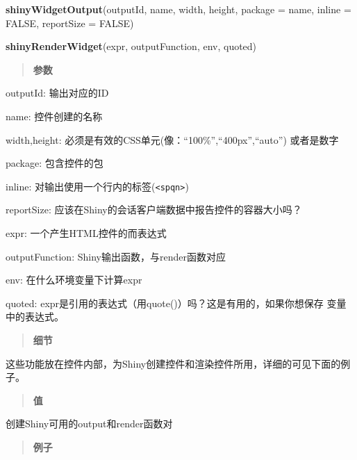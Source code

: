 \documentclass[]{book}
\newenvironment{Shaded}{\begin{snugshade}}{\end{snugshade}}
\newcommand{\KeywordTok}[1]{\textcolor[rgb]{0.13,0.29,0.53}{\textbf{#1}}}
\newcommand{\DataTypeTok}[1]{\textcolor[rgb]{0.13,0.29,0.53}{#1}}
\newcommand{\OtherTok}[1]{\textcolor[rgb]{0.56,0.35,0.01}{#1}}
\newcommand{\NormalTok}[1]{#1}
\theoremstyle{definition}
\theoremstyle{definition}
\theoremstyle{definition}
\theoremstyle{remark}
\begin{document}
\begin{Shaded}
\begin{Highlighting}[]
\KeywordTok{shinyWidgetOutput}\NormalTok{(outputId, name, width, height, }\DataTypeTok{package =}\NormalTok{ name,}
  \DataTypeTok{inline =} \OtherTok{FALSE}\NormalTok{, }\DataTypeTok{reportSize =} \OtherTok{FALSE}\NormalTok{)}
  
\KeywordTok{shinyRenderWidget}\NormalTok{(expr, outputFunction, env, quoted)}
\end{Highlighting}
\end{Shaded}

\begin{quote}
\textbf{参数}
\end{quote}

outputId: 输出对应的ID

name: 控件创建的名称

width,height: 必须是有效的CSS单元(像：``100\%'',``400px'',``auto'')
或者是数字

package: 包含控件的包

inline: 对输出使用一个行内的标签(\texttt{\textless{}spqn\textgreater{}})

reportSize: 应该在Shiny的会话客户端数据中报告控件的容器大小吗？

expr: 一个产生HTML控件的而表达式

outputFunction: Shiny输出函数，与render函数对应

env: 在什么环境变量下计算expr

quoted: expr是引用的表达式（用quote()）吗？这是有用的，如果你想保存
变量中的表达式。

\begin{quote}
\textbf{细节}
\end{quote}

这些功能放在控件内部，为Shiny创建控件和渲染控件所用，详细的可见下面的例子。

\begin{quote}
\textbf{值}
\end{quote}

创建Shiny可用的output和render函数对

\begin{quote}
\textbf{例子}
\end{quote}
\end{document}
